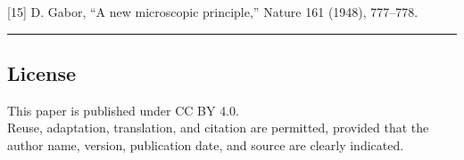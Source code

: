 \documentclass[
]{article}
\begin{document}
{[}15{]} D. Gabor, ``A new microscopic principle,'' Nature 161 (1948),
777--778.

\begin{center}\rule{0.5\linewidth}{0.5pt}\end{center}

\subsection{License}\label{license}

This paper is published under CC BY 4.0.\\
Reuse, adaptation, translation, and citation are permitted, provided
that the author name, version, publication date, and source are clearly
indicated.
\end{document}
